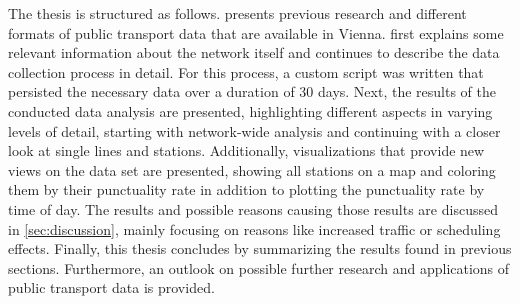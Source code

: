 The thesis is structured as follows.  presents previous research and different formats of public transport data that are available in Vienna.  first explains some relevant information about the network itself and continues to describe the data collection process in detail. For this process, a custom script was written that persisted the necessary data over a duration of 30 days. Next, the results of the conducted data analysis are presented, highlighting different aspects in varying levels of detail, starting with network-wide analysis and continuing with a closer look at single lines and stations. Additionally, visualizations that provide new views on the data set are presented, showing all stations on a map and coloring them by their punctuality rate in addition to plotting the punctuality rate by time of day. The results and possible reasons causing those results are discussed in \cref{sec:discussion}, mainly focusing on reasons like increased traffic or scheduling effects. Finally, this thesis concludes by summarizing the results found in previous sections. Furthermore, an outlook on possible further research and applications of public transport data is provided.